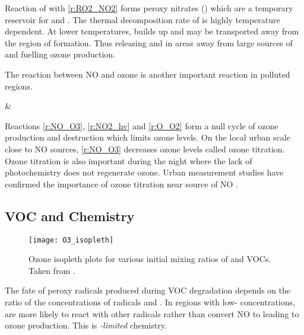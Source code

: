 Reaction of  with  \eqref{r:RO2_NO2} forms peroxy nitrates () which are a temporary reservoir for  and .
The thermal decomposition rate of  is highly temperature dependent.
At lower temperatures,  builds up and may be transported away from the region of formation. 
Thus releasing  and  in areas away from large sources of  and fuelling ozone production.

The reaction between NO and ozone is another important reaction in polluted regions.
\begin{rxnarray}
     & \rightarrow {} \label{r:NO_O3}
\end{rxnarray}
Reactions \eqref{r:NO_O3}, \eqref{r:NO2_hv} and \eqref{r:O_O2} form a null cycle of ozone production and destruction which limits ozone levels.
On the local urban scale close to NO sources, \eqref{r:NO_O3} decreases ozone levels called ozone titration.
Ozone titration is also important during the night where the lack of photochemistry does not regenerate ozone.
Urban measurement studies have confirmed the importance of ozone titration near source of NO \citep{Syri:2001}.

\subsection[VOC and NOx Chemistry]{VOC and  Chemistry} \label{ss:VOC_NOx}
\begin{figure}%
	\begin{center}%
        \caption[Ozone mixing ratios as a function of  and VOCs]{Ozone isopleth plots for various initial mixing ratios of  and VOCs. Taken from \citet{Jenkin:2000}.}%
        \texttt{[image: O3\_isopleth]}%
		\label{f:O3_isopleth}%
	\end{center}%
\end{figure}%
The fate of peroxy radicals produced during VOC degradation depends on the ratio of the concentrations of radicals and  \citep{Kleinman:1991, Kleinman:1994}.
In regions with low- concentrations,  are more likely to react with other radicals rather than convert NO to  leading to ozone production.
This is \emph{-limited} chemistry.

